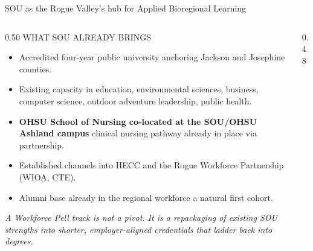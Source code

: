 \documentclass[aspectratio=169,11pt]{beamer}
\newcommand{\eyebrow}[1]{%
  {\sffamily\fontsize{7.5pt}{9pt}\selectfont
   \color{textMuted}%
   \MakeUppercase{#1}%
  }%
}
\newcommand{\theEyebrowText}{}
\newcommand{\frametitleEyebrow}[1]{\renewcommand{\theEyebrowText}{#1}}
\begin{document}
\frametitleEyebrow{Position / bioregional anchor}
\begin{frame}{SOU as the Rogue Valley's hub for Applied Bioregional Learning}
  \begin{columns}[T,onlytextwidth]
    \begin{column}{0.50\textwidth}
      \rmfamily\fontsize{10.5pt}{14pt}\selectfont
      \color{textPrimary}
      \eyebrow{what SOU already brings}
      \vspace{4pt}
      \begin{itemize}\itemsep2pt
        \item Accredited four-year public university anchoring
              Jackson and Josephine counties.
        \item Existing capacity in education, environmental
              sciences, business, computer science, outdoor
              adventure leadership, public health.
        \item \textbf{OHSU School of Nursing co-located at the
              SOU/OHSU Ashland campus} \textemdash{} clinical
              nursing pathway already in place via partnership.
        \item Established channels into HECC and the Rogue
              Workforce Partnership (WIOA, CTE).
        \item Alumni base already in the regional workforce
              \textemdash{} a natural first cohort.
      \end{itemize}
      \vspace{6pt}
      \color{textSecondary}\itshape\fontsize{10pt}{13pt}\selectfont
      A Workforce Pell track is not a pivot. It is a repackaging
      of existing SOU strengths into shorter, employer-aligned
      credentials that ladder back into degrees.
    \end{column}
    \begin{column}{0.48\textwidth}
      \centering
\end{column}
\end{columns}
\end{frame}
\end{document}
